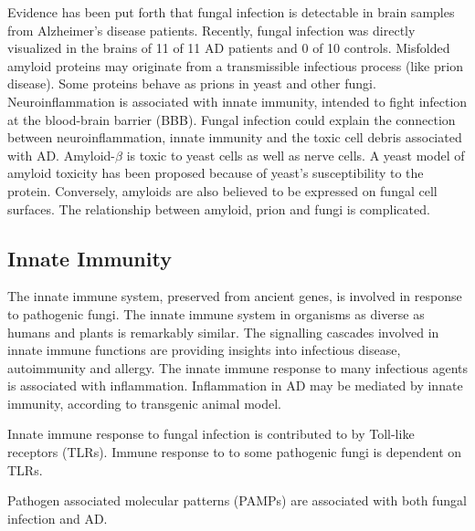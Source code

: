 \documentclass[twocolumn]{article}
\begin{document}
Evidence has been put forth that fungal infection is detectable
in brain samples from Alzheimer's disease patients.
\cite{alonso2013fungal}
Recently, fungal infection was directly visualized in the brains
of 11 of 11 AD patients and 0 of 10 controls.
\cite{pisa2015different}
Misfolded amyloid proteins may originate from a transmissible infectious process
(like prion disease).
Some proteins behave as prions in yeast and other fungi.
\cite{soto2006amyloids}
Neuroinflammation is associated with innate immunity,
intended to fight infection at the blood-brain barrier (BBB).
\cite{hauwel2005innate}
Fungal infection could explain the connection between
neuroinflammation, innate immunity and the toxic cell
debris associated with AD.
Amyloid-$\beta$ is toxic to yeast cells
as well as nerve cells.
A yeast model of amyloid toxicity has been proposed
because of yeast's susceptibility to the protein.
\cite{treusch2011functional}
Conversely, amyloids are also believed to be
expressed on fungal cell surfaces.
\cite{gebbink2005amyloids}
The relationship between amyloid, prion and fungi is complicated.
\cite{tessier2009unraveling}

\subsection{Innate Immunity}
The innate immune system, preserved from ancient genes,
is involved in response to pathogenic fungi.
\cite{means2009evolutionarily}
The innate immune system in organisms as diverse as humans and plants
is remarkably similar.
\cite{nurnberger2002innate, nurnberger2004innate}
The signalling cascades involved in innate immune functions
are providing insights into infectious disease, autoimmunity and allergy.
The innate immune response to many infectious agents is associated with
inflammation.
\cite{akira2006pathogen}
Inflammation in AD may be mediated by innate immunity,
according to transgenic animal model.
\cite{fassbender2004lps}

Innate immune response to fungal infection is
contributed to by Toll-like receptors (TLRs).
\cite{bellocchio2004contribution}
Immune response to to some pathogenic fungi is dependent
on TLRs.
\cite{viriyakosol2005innate}

Pathogen associated molecular patterns (PAMPs) are
associated with both fungal infection
\cite{kumar2011pathogen}
and AD.
\cite{salminen2009inflammation}




\end{document}

